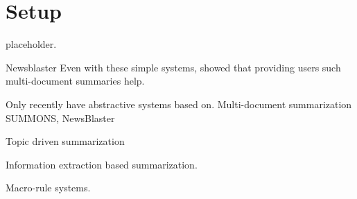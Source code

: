 \chapter{Setup}
placeholder.

Newsblaster
Even with these simple systems, \citet{mckeown2005summaries} showed that providing users such multi-document summaries help.

Only recently have abstractive systems based on.
Multi-document summarization SUMMONS, NewsBlaster

Topic driven summarization

Information extraction based summarization.


Macro-rule systems.

